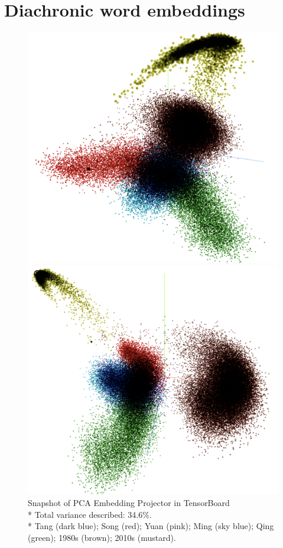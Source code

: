 \section{Diachronic word embeddings}
\begin{figure}[H]
\centering
\begin{minipage}[b]{0.45\linewidth}
  \includegraphics[width=\textwidth]{figures/pca_embedding_projector}
\end{minipage}
\quad
\begin{minipage}[b]{0.45\linewidth}
  \includegraphics[width=\textwidth]{figures/pca_embedding_projector_2}
\end{minipage}
\caption{Snapshot of PCA Embedding Projector in TensorBoard\\\footnotesize{* Total variance described: 34.6\%.\\* Tang (dark blue); Song (red); Yuan (pink); Ming (sky blue); Qing (green); 1980s (brown); 2010s (mustard).}}
\end{figure}

